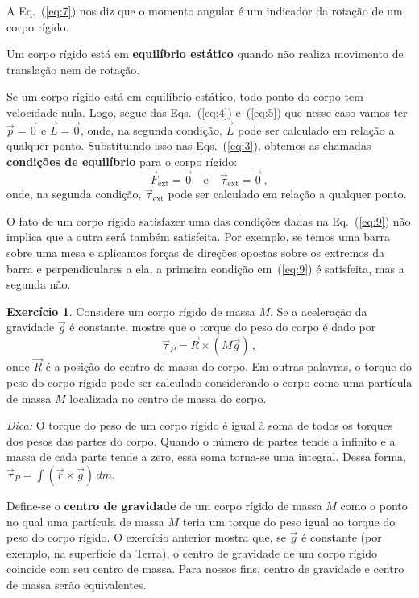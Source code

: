 \documentclass[twocolumn=on,fontsize=12pt,DIV=calc]{scrartcl}
\theoremstyle{definition}
\newtheorem{ex}{Exercício}[section]
\begin{document}
A Eq.~(\ref{eq:7}) nos diz que o momento angular é um indicador da
rotação de um corpo rígido.

Um corpo rígido está em \textbf{equi\-lí\-brio es\-tá\-ti\-co} quando não realiza
movimento de translação nem de rotação.

Se um corpo rígido está em equilíbrio estático, todo ponto do corpo
tem velocidade nula. Logo, segue das Eqs.~(\ref{eq:4}) e~(\ref{eq:5})
que nesse caso vamos ter $\vec p=\vec 0$ e $\vec L=\vec 0$,
onde, na segunda condição, $\vec L$ pode ser calculado em relação a
qualquer ponto. Substituindo isso nas Eqs.~(\ref{eq:3}), obtemos as
chamadas \textbf{condições de equilíbrio} para o corpo rígido:
\begin{equation}
  \label{eq:9}
  {\vec F}_{\mathrm{ext}}=\vec 0\quad\text{e}\quad \vec\tau_{\mathrm{ext}}=\vec 0\,,
\end{equation}
onde, na segunda condição, $\vec\tau_{\mathrm{ext}}$ pode ser
calculado em relação a qualquer ponto.

O fato de um corpo rígido satisfazer uma das condições dadas na
Eq.~(\ref{eq:9}) não implica que a outra será também satisfeita. Por
exemplo, se temos uma barra sobre uma mesa e aplicamos forças de
direções opostas sobre os extremos da barra e perpendiculares a ela, a
primeira condição em~(\ref{eq:9}) é satisfeita, mas a segunda não.

\begin{ex}
  \label{ex:1}
  Considere um corpo rígido de massa $M$. Se a aceleração da gravidade
  $\vec g$ é constante, mostre que o torque do peso do corpo é dado
  por
  $$\vec\tau_P=\vec R\times(M\vec g)\,,$$
  onde $\vec R$ é a posição do
  centro de massa do corpo. Em outras palavras, o torque do peso do
  corpo rígido pode ser calculado considerando o corpo como uma
  partícula de massa $M$ localizada no centro de massa do corpo.

  \noindent\textit{Dica:} O torque do peso de um corpo rígido é igual
  à soma de todos os torques dos pesos das partes do corpo. Quando o
  número de partes tende a infinito e a massa de cada parte tende a
  zero, essa soma torna-se uma integral. Dessa forma,
  $\vec\tau_P=\int (\vec r\times\vec g)\,dm$.
\end{ex}

Define-se o \textbf{centro de gravidade} de um corpo rígido de massa $M$
como o ponto no qual uma partícula de massa $M$ teria um torque do
peso igual ao torque do peso do corpo rígido. O exercício anterior
mostra que, se $\vec g$ é constante (por exemplo, na superfície da
Terra), o centro de gravidade de um corpo rígido coincide com seu
centro de massa. Para nossos fins, centro de gravidade e centro de
massa serão equivalentes.
\end{document}
